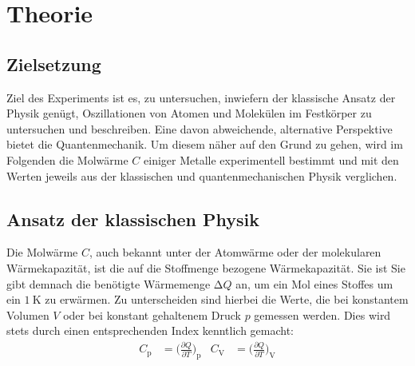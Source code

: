 \section{Theorie}
\label{sec:Theorie}
\subsection{Zielsetzung}
    Ziel des Experiments ist es, zu untersuchen, inwiefern der klassische Ansatz der Physik genügt, Oszillationen von 
    Atomen und Molekülen im Festkörper zu untersuchen und beschreiben. 
    Eine davon abweichende, alternative Perspektive bietet die Quantenmechanik. 
    Um diesem näher auf den Grund zu gehen, wird im Folgenden die Molwärme $C$ einiger Metalle experimentell bestimmt und 
    mit den Werten jeweils aus der klassischen und quantenmechanischen Physik verglichen. 
\subsection{Ansatz der klassischen Physik}
    Die Molwärme $C$, auch bekannt unter der Atomwärme oder der molekularen Wärmekapazität, ist die auf die 
    Stoffmenge bezogene Wärmekapazität. 
    Sie ist 
    Sie gibt demnach die benötigte Wärmemenge $\increment Q$ an, um ein Mol eines Stoffes um ein $\SI{1}{\kelvin}$ zu erwärmen.
    Zu unterscheiden sind hierbei die Werte, die bei konstantem Volumen $V$ oder bei konstant gehaltenem Druck $p$ gemessen 
    werden. Dies wird stets durch einen entsprechenden Index kenntlich gemacht: 
    \begin{align*}
        C_{\text{p}} &= \biggl(\frac{\partial Q}{\partial T}\biggr)_{\text{p}} &
        C_{\text{V}} &= \biggl(\frac{\partial Q}{\partial T}\biggr)_{\text{V}} \\
    \end{align*}
